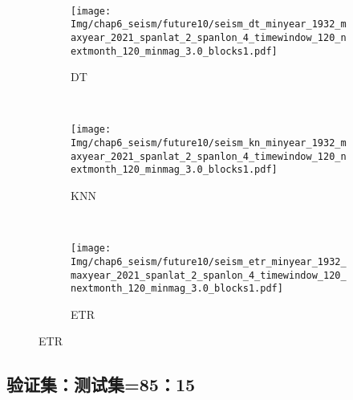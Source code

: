 \begin{figure}[!htbp]
\begin{subfigure}[b]{0.45\textwidth}
    \vspace{-1cm}
    \label{fig:seism_gbr_minyear_1932_maxyear_2021_spanlat_2_spanlon_4_timewindow_120_nextmonth_120_minmag_3.0_blocks1}
  \end{subfigure}
  ~
  \begin{subfigure}[b]{0.45\textwidth}
    \caption{DT}
    \vspace{-0.2cm}
    \texttt{[image: Img/chap6\_seism/future10/seism\_dt\_minyear\_1932\_maxyear\_2021\_spanlat\_2\_spanlon\_4\_timewindow\_120\_nextmonth\_120\_minmag\_3.0\_blocks1.pdf]}
    \vspace{-1cm}
    \label{fig:seism_dt_minyear_1932_maxyear_2021_spanlat_2_spanlon_4_timewindow_120_nextmonth_120_minmag_3.0_blocks1}
  \end{subfigure}
  \\
  \begin{subfigure}[b]{0.45\textwidth}
    \caption{KNN}
    \vspace{-0.2cm}
    \texttt{[image: Img/chap6\_seism/future10/seism\_kn\_minyear\_1932\_maxyear\_2021\_spanlat\_2\_spanlon\_4\_timewindow\_120\_nextmonth\_120\_minmag\_3.0\_blocks1.pdf]}
    \vspace{-1cm}
    \label{fig:seism_knn_minyear_1932_maxyear_2021_spanlat_2_spanlon_4_timewindow_120_nextmonth_120_minmag_3.0_blocks1}
  \end{subfigure}
  ~
  \begin{subfigure}[b]{0.45\textwidth}
    \caption{ETR}
    \vspace{-0.2cm}
    \texttt{[image: Img/chap6\_seism/future10/seism\_etr\_minyear\_1932\_maxyear\_2021\_spanlat\_2\_spanlon\_4\_timewindow\_120\_nextmonth\_120\_minmag\_3.0\_blocks1.pdf]}
    \vspace{-1cm}
    \label{fig:seism_etr_minyear_1932_maxyear_2021_spanlat_2_spanlon_4_timewindow_120_nextmonth_120_minmag_3.0_blocks1}
  \end{subfigure}
  \label{fig:seism_minyear_1932_maxyear_2021_spanlat_2_spanlon_4_timewindow_120_nextmonth_120_minmag_3.0_blocks1}
\end{figure}

\subsection{验证集：测试集=85：15}\label{sec:seism_result_10_85}

